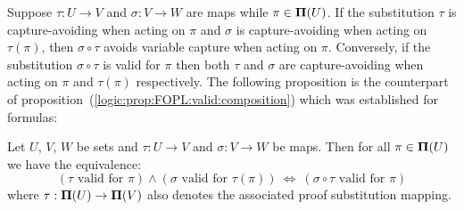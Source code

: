 Suppose $\tau:U\to V$ and $\sigma:V\to W$ are maps while
$\pi\in{\bf\Pi}(U)$.  If the substitution $\tau$ is capture-avoiding
when acting on $\pi$ and $\sigma$ is capture-avoiding when acting on
$\tau(\pi)$, then $\sigma\circ\tau$ avoids variable capture when
acting on $\pi$. Conversely, if the substitution $\sigma\circ\tau$
is valid for $\pi$ then both $\tau$ and $\sigma$ are
capture-avoiding when acting on $\pi$ and $\tau(\pi)$ respectively.
The following proposition is the counterpart of
proposition~(\ref{logic:prop:FOPL:valid:composition}) which was
established for formulas:
\begin{prop}\label{logic:prop:FUAP:validsubproof:composition}
Let $U$, $V$, $W$ be sets and $\tau:U\to V$ and $\sigma:V\to W$ be
maps. Then for all $\pi\in{\bf\Pi}(U)$ we have the equivalence:
\[
    (\mbox{$\tau$ valid for $\pi$})\land(\mbox{$\sigma$ valid for
    $\tau(\pi)$})\ \Leftrightarrow\ (\mbox{$\sigma\circ\tau$ valid for
    $\pi$})
\]
where $\tau:{\bf\Pi}(U)\to{\bf\Pi}(V)$ also denotes the associated
proof substitution mapping.
\end{prop}
